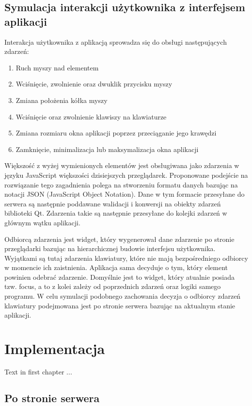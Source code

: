 \documentclass[polish]{inz}
\begin{document}
\section{Symulacja interakcji użytkownika z interfejsem aplikacji}
Interakcja użytkownika z aplikacją sprowadza się do obsługi następujących zdarzeń:
\begin{enumerate}
  \item Ruch myszy nad elementem
  \item Wciśnięcie, zwolnienie oraz dwuklik przycisku myszy
  \item Zmiana położenia kółka myszy
  \item Wciśnięcie oraz zwolnienie klawiszy na klawiaturze
  \item Zmiana rozmiaru okna aplikacji poprzez przeciąganie jego krawędzi
  \item Zamknięcie, minimalizacja lub maksymalizacja okna aplikacji
\end{enumerate}
Większość z wyżej wymienionych elementów jest obsługiwana jako zdarzenia w języku JavaScript większości dzisiejszych przeglądarek. Proponowane podejście na rozwiązanie tego zagadnienia polega na stworzeniu formatu danych bazując na notacji JSON (JavaScript Object Notation). Dane w tym formacie przesyłane do serwera są następnie poddawane walidacji i konwersji na obiekty zdarzeń biblioteki Qt. Zdarzenia takie są następnie przesyłane do kolejki zdarzeń w głównym wątku aplikacji.

Odbiorcą zdarzenia jest widget, który wygenerował dane zdarzenie po stronie przeglądarki bazując na hierarchicznej budowie interfejsu użytkownika. Wyjątkami są tutaj zdarzenia klawiatury, które nie mają bezpośredniego odbiorcy w momencie ich zaistnienia. Aplikacja sama decyduje o tym, który element powinien odebrać zdarzenie. Domyślnie jest to widget, który atualnie posiada tzw. focus, a to z kolei zależy od poprzednich zdarzeń oraz logiki samego programu. W celu symulacji podobnego zachowania decyzja o odbiorcy zdarzeń klawiatury podejmowana jest po stronie serwera bazując na aktualnym stanie aplikacji.

\chapter{Implementacja}
Text in first chapter ...



\section{Po stronie serwera}
\label{sec:implementation_server}
\end{document}
